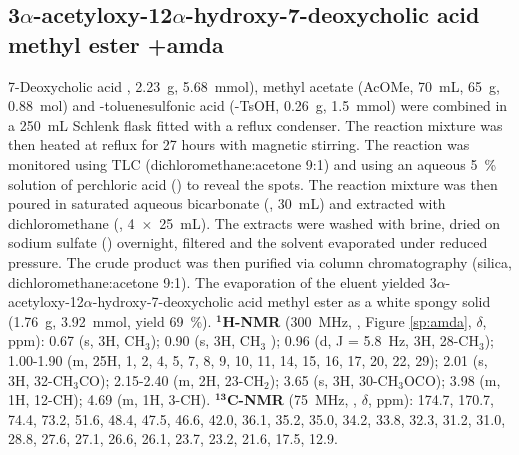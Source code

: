 \subsection[3$\alpha$-acetyloxy-12$\alpha$-hydroxy-7-deoxy\-cholic acid methyl \\ester \cmpd+{amda}]{3$\alpha$-acetyloxy-12$\alpha$-hydroxy-7-deoxy\-cholic acid \\methyl ester \cmpd+{amda}}\label{sec:sperimentale-amda}

7-Deoxycholic acid , 2.23~g, 5.68~mmol), methyl acetate (AcOMe, 70~mL, 65~g, 0.88~mol) and \p-toluenesulfonic acid (\p-TsOH,
 0.26~g, 1.5~mmol) were combined in a 250~mL Schlenk flask fitted with a reflux condenser. The reaction mixture was then heated at reflux for 27 hours with magnetic stirring. The reaction was monitored using TLC (di\-chloro\-methane:acetone 9:1) %
 and using an aqueous 5~\% solution of perchloric acid () to reveal the spots. The reaction mixture was then poured in saturated aqueous bicarbonate (, 30~mL) and %
 extracted with di\-chloro\-methane (, 4~$\times$~25~mL). The extracts were washed with brine, dried on sodium sulfate () overnight, filtered and the
solvent evaporated under reduced pressure. The crude product was then purified via column chromatography (silica, di\-chloro\-methane:acetone 9:1). 
The evaporation of the eluent yielded 3$\alpha$-acetyloxy-12$\alpha$-hydroxy-7-deoxy\-cholic acid methyl ester  as a white spongy solid (1.76~g, 3.92~mmol, yield 69~\%). $\mathbf{^{1}}$\textbf{H-NMR} (300~MHz, , Figure \ref{sp:amda}, $\delta$, ppm):  0.67 (s, 3H, CH$_3$); 0.90 (s, 3H, CH$_3$%
); 0.96 (d, J = 5.8~Hz, 3H, 28-CH$_3$); 1.00-1.90 (m, 25H, 1, 2, 4, 5, 7, 8, 9, 10, 11, 14, 15, 16, 17, 20, 22, 29); 2.01 (s, 3H, 32-CH$_3$CO); 2.15-2.40 (m, 2H, 23-CH$_2$); 3.65 (s, 3H, 30-CH$_3$OCO); 3.98 (m, 1H, 12-CH); 4.69 (m, 1H, 3-CH). $\mathbf{^{13}}$\textbf{C-NMR} (75~MHz, , $\delta$, ppm):  174.7, 170.7, 74.4, 73.2, 51.6, 48.4, 47.5, 46.6, 42.0, 36.1, 35.2, 35.0, 34.2, 33.8, 32.3, 31.2, 31.0, 28.8, 27.6, 27.1, 26.6, 26.1, 23.7, 23.2, 21.6, 17.5, 12.9.

